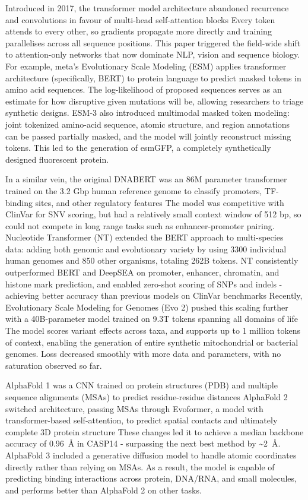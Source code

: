 Introduced in 2017, the transformer model architecture abandoned recurrence and convolutions in favour of multi-head self-attention blocks Every token attends to every other, so gradients propagate more directly and training parallelises across all sequence positions. This paper triggered the field-wide shift to attention-only networks that now dominate NLP, vision and sequence biology. For example, meta's Evolutionary Scale Modeling (ESM) applies transformer architecture (specifically, BERT) to protein language to predict masked tokens in amino acid sequences. The log-likelihood of proposed sequences serves as an estimate for how disruptive given mutations will be, allowing researchers to triage synthetic designs. ESM-3 also introduced multimodal masked token modeling: joint tokenized amino-acid sequence, atomic structure, and region annotations can be passed partially masked, and the model will jointly reconstruct missing tokens. This led to the generation of esmGFP, a completely synthetically designed fluorescent protein.

In a similar vein, the original DNABERT was an 86M parameter transformer trained on the 3.2 Gbp human reference genome to classify promoters, TF-binding sites, and other regulatory features The model was competitive with ClinVar for SNV scoring, but had a relatively small context window of 512 bp, so could not compete in long range tasks such as enhancer-promoter pairing. Nucleotide Transformer (NT) extended the BERT approach to multi-species data: adding both genomic and evolutionary variety by using \num{3300} individual human genomes and 850 other organisms, totaling 262B tokens. NT consistently outperformed BERT and DeepSEA on promoter, enhancer, chromatin, and histone mark prediction, and enabled zero-shot scoring of SNPs and indels - achieving better accuracy than previous models on ClinVar benchmarks Recently, Evolutionary Scale Modeling for Genomes (Evo 2) pushed this scaling further with a 40B-parameter model trained on 9.3T tokens spanning all domains of life The model scores variant effects across taxa, and supports up to 1 million tokens of context, enabling the generation of entire synthetic mitochondrial or bacterial genomes. Loss decreased smoothly with more data and parameters, with no saturation observed so far.

AlphaFold 1 was a CNN trained on protein structures (PDB) and multiple sequence alignments (MSAs) to predict residue-residue distances AlphaFold 2 switched architecture, passing MSAs through Evoformer, a model with transformer-based self-attention, to predict spatial contacts and ultimately complete 3D protein structure These changes led it to achieve a median backbone accuracy of \SI{0.96}{\angstrom} in CASP14 - surpassing the next best method by \textasciitilde\SI{2}{\angstrom}. AlphaFold 3 included a generative diffusion model to handle atomic coordinates directly rather than relying on MSAs. As a result, the model is capable of predicting binding interactions across protein, DNA/RNA, and small molecules, and performs better than AlphaFold 2 on other tasks.

